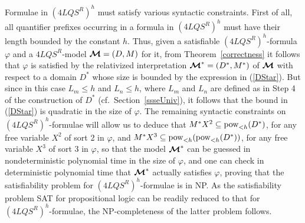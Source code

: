 \documentclass{fundam}
\newcommand{\model}{\ensuremath{\mbox{\boldmath $\mathcal{M}$}}\xspace}
\newcommand{\pow}{\mbox{\rm pow}}
\newcommand{\QLQSR}{\ensuremath{\mbox{$4\mathit{LQS}^{R}$}}\xspace}
\begin{document}
Formulae in $(\QLQSR)^h$ must satisfy various syntactic constraints.
First of all, all quantifier prefixes occurring in a formula in
$(\QLQSR)^h$ must have their length bounded by the constant $h$.
Thus, given a satisfiable $(\QLQSR)^h$-formula $\varphi$ and a
$\QLQSR$-model $\model = (D, M)$ for it, from
Theorem~\ref{correctness} it follows that $\varphi$ is satisfied by
the relativized interpretation $\model^* = (D^{*}, M^{*})$ of $\model$
with respect to a domain $D^{*}$ whose size is bounded by the
expression in (\ref{DStar}).  But since in this case $L_{m} \leq h$
and $L_{n} \leq h$, where $L_{m}$ and $L_{n}$ are defined as in Step 4
of the construction of $D^{*}$ (cf.\ Section~\ref{ssseUniv}), it
follows that the bound in (\ref{DStar}) is quadratic in the size of
$\varphi$.  The remaining syntactic constraints on
$(\QLQSR)^h$-formulae will allow us to deduce that $M^{*}X^2 \subseteq
\pow_{< h}(D^{*})$, for any free variable $X^{2}$ of sort 2 in
$\varphi$, and $M^{*}X^3 \subseteq \pow_{< h}(\pow_{< h}(D^{*}))$, for
any free variable $X^{3}$ of sort 3 in $\varphi$, so that the model
$\model^{*}$ can be guessed in nondeterministic polynomial time in the
size of $\varphi$, and one can check in deterministic polynomial time
that $\model^{*}$ actually satisfies $\varphi$, proving that the
satisfiability problem for $(\QLQSR)^h$-formulae is in \textsf{NP}.
As the satisfiability problem \textsf{SAT} for propositional logic can
be readily reduced to that for $(\QLQSR)^h$-formulae, the
\textsf{NP}-completeness of the latter problem follows.
\end{document}
